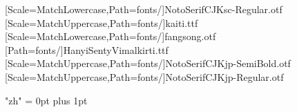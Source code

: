 
\setlength{\headheight}{15pt}
\renewcommand{\thehaikucounter}{\arabic{haikucounter}}

\newenvironment{haiku}{
    \refstepcounter{haikucounter}
    \centering\thehaikucounter\\[1ex]\begin{parse lines}{##1\newline}
    }%
    {\end{parse lines}}

\setcounter{secnumdepth}{-1}
\setcounter{tocdepth}{1}

\newfontfamily{\FS}[Scale=MatchLowercase,Path=fonts/]{NotoSerifCJKsc-Regular.otf}
\newfontfamily{\FK}[Scale=MatchUppercase,Path=fonts/]{kaiti.ttf}
\newfontfamily{\FT}[Scale=MatchLowercase,Path=fonts/]{fangsong.otf}
\newfontfamily{\FF}[Path=fonts/]{HanyiSentyVimalkirti.ttf} %
\newfontfamily{\FH}[Scale=MatchUppercase,Path=fonts/]{NotoSerifCJKjp-SemiBold.otf}
\newfontfamily{\FM}[Scale=MatchUppercase,Path=fonts/]{NotoSerifCJKjp-Regular.otf}

\graphicspath{{figures/}}

\renewcommand{\rubysize}{0.5}
\renewcommand{\rubysep}{0em}
\renewcommand{\contentsname}{\FK 目录}
\renewcommand{\bookname}{}

\XeTeXlinebreaklocale "zh"
\XeTeXlinebreakskip = 0pt plus 1pt
\makeatletter
\let\@afterindentfalse\@afterindenttrue
\@afterindenttrue
\makeatother
\setlength{\parindent}{2em}

\setlength{\footnotemargin}{1em}
\renewcommand{\hangfootparskip}{0pt}
\renewcommand{\thefootnote}{\arabic{footnote}}

\pagecolor{fondpaille}
